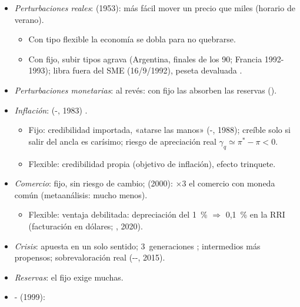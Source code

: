 \documentclass{article}
\begin{document}
\begin{columnas}
\begin{itemize}
\item \emph{Perturbaciones reales}:  (1953): más fácil mover un precio que miles (horario de verano).
  \begin{itemize}
  \item Con tipo flexible la economía se dobla para no quebrarse.
  \item Con fijo, subir tipos agrava (Argentina, finales de los 90; Francia 1992-1993); libra fuera del SME (16/9/1992), peseta devaluada  .
  \end{itemize}
\item \emph{Perturbaciones monetarias}: al revés: con fijo las absorben las reservas (\hyperref[rep:I.3]{}).
\item \emph{Inflación}:  (-, 1983) .
  \begin{itemize}
  \item Fijo: credibilidad importada, «atarse las manos» (-, 1988); creíble solo si salir del ancla es carísimo; riesgo de apreciación real $\gamma_q\simeq\pi^*-\pi<0$.
  \item Flexible: credibilidad propia (objetivo de inflación), efecto trinquete.
  \end{itemize}
\end{itemize}
\begin{itemize}
\item \emph{Comercio}: fijo, sin riesgo de cambio;  (2000): $\times3$ el comercio con moneda común (metaanálisis: mucho menos).
  \begin{itemize}
  \item Flexible: ventaja debilitada: depreciación del 1~\% $\Rightarrow$ 0,1~\% en la RRI (facturación en dólares; , 2020).
  \end{itemize}
\item \emph{Crisis}: apuesta en un solo sentido; 3~generaciones ; intermedios más propensos; sobrevaloración real (--, 2015).
\item \emph{Reservas}: el fijo exige muchas.
\end{itemize}
\begin{itemize}
\item {}- (1999):

\end{itemize}
\end{columnas}
\end{document}

